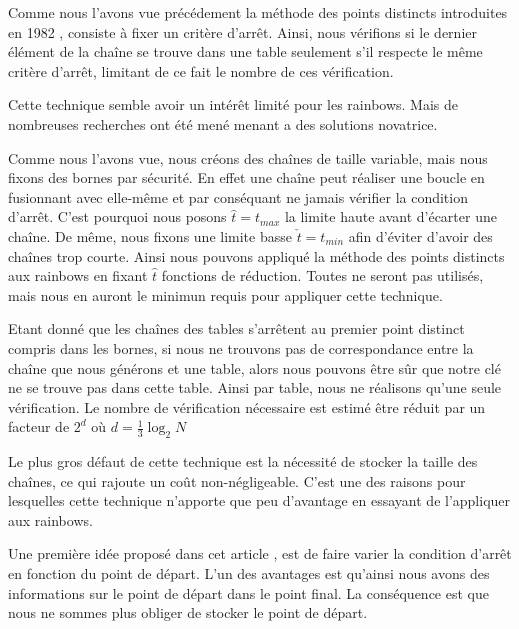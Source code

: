 	Comme nous l'avons vue précédement la méthode des points distincts introduites en 1982 \cite{Rivest}, consiste à fixer un critère d'arrêt. Ainsi, nous vérifions si le dernier élément de la chaîne se trouve dans une table seulement s'il respecte le même critère d'arrêt, limitant de ce fait le nombre de ces vérification.

	\bigskip

	Cette technique semble avoir un intérêt limité pour les \gls{rainbows}. Mais de nombreuses recherches ont été mené menant a des solutions novatrice.

	\bigskip


		Comme nous l'avons vue, nous créons des chaînes de taille variable, mais nous fixons des bornes par sécurité. En effet une chaîne peut réaliser une boucle en fusionnant avec elle-même et par conséquant ne jamais vérifier la condition d'arrêt. C'est pourquoi nous posons $\hat{t}=t_{max}$ la limite haute avant d'écarter une chaîne. De même, nous fixons une limite basse $\check{t}=t_{min}$ afin d'éviter d'avoir des chaînes trop courte. Ainsi nous pouvons appliqué la méthode des points distincts aux \gls{rainbows} en fixant $\hat{t}$ fonctions de réduction. Toutes ne seront pas utilisés, mais nous en auront le minimun requis pour appliquer cette technique.

		\bigskip

		Etant donné que les chaînes des tables s'arrêtent au premier point distinct compris dans les bornes, si nous ne trouvons pas de correspondance entre la chaîne que nous générons et une table, alors nous pouvons être sûr que notre clé ne se trouve pas dans cette table. Ainsi par table, nous ne réalisons qu'une seule vérification. Le nombre de vérification nécessaire est estimé être réduit par un facteur de $2^d$ où $d=\frac{1}{3}\log_2 N$

		\bigskip

		Le plus gros défaut de cette technique est la nécessité de stocker la taille des chaînes, ce qui rajoute un coût non-négligeable. C'est une des raisons pour lesquelles cette technique n'apporte que peu d'avantage en essayant de l'appliquer aux \gls{rainbows}.

		\bigskip


		Une première idée proposé dans cet article \cite{VDP}, est de faire varier la condition d'arrêt en fonction du point de départ. L'un des avantages est qu'ainsi nous avons des informations sur le point de départ dans le point final. La conséquence est que nous ne sommes plus obliger de stocker le point de départ.

